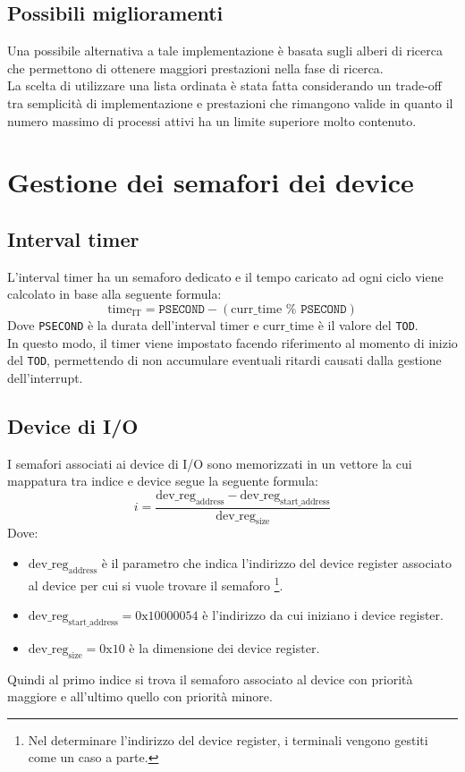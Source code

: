 \documentclass[11pt]{article}
\begin{document}
\subsection{Possibili miglioramenti}
Una possibile alternativa a tale implementazione è basata sugli alberi di ricerca che permettono di ottenere maggiori prestazioni nella fase di ricerca. \\
La scelta di utilizzare una lista ordinata è stata fatta considerando un trade-off tra semplicità di implementazione e prestazioni che rimangono valide in quanto il numero massimo di processi attivi ha un limite superiore molto contenuto.

\newpage
\section{Gestione dei semafori dei device}
\subsection{Interval timer}
L'interval timer ha un semaforo dedicato e il tempo caricato ad ogni ciclo viene calcolato in base alla seguente formula:
\begin{equation}
    \text{time}_{\text{IT}} = \texttt{PSECOND} - (\text{curr}\_\text{time } \% \texttt{ PSECOND})
\end{equation}
Dove \texttt{PSECOND} è la durata dell'interval timer e $\text{curr}\_\text{time}$ è il valore del \texttt{TOD}.\\
In questo modo, il timer viene impostato facendo riferimento al momento di inizio del \texttt{TOD}, permettendo di non accumulare eventuali ritardi causati dalla gestione dell'interrupt.

\subsection{Device di I/O}
I semafori associati ai device di I/O sono memorizzati in un vettore la cui mappatura tra indice e device segue la seguente formula:
\begin{equation}
    i = \dfrac{\text{dev\_reg}_{\text{address}} - \text{dev\_reg}_{\text{start\_address}}}{\text{dev\_reg}_{\text{size}}} 
\end{equation}
Dove:
\begin{itemize}
    \item $\text{dev\_reg}_{\text{address}}$ è il parametro che indica l'indirizzo del device register associato al device per cui si vuole trovare il semaforo
            \footnote{Nel determinare l'indirizzo del device register, i terminali vengono gestiti come un caso a parte.}.
    \item $\text{dev\_reg}_{\text{start\_address}}=0\text{x}10000054$ è l'indirizzo da cui iniziano i device register.
    \item $\text{dev\_reg}_{\text{size}}=0\text{x}10$ è la dimensione dei device register.
\end{itemize}
Quindi al primo indice si trova il semaforo associato al device con priorità maggiore e all'ultimo quello con priorità minore.
\end{document}
